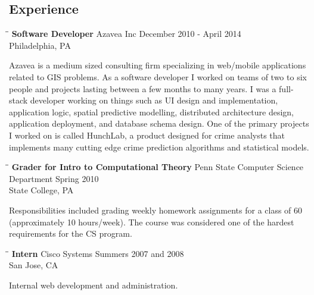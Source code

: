 \documentclass{res}
\begin{document}
\begin{resume}
\section{Experience}
   \vspace{-0.1in}	
   \begin{tabbing}
   \hspace{2.3in}\= \hspace{2.6in}\= \kill %
    {\bf Software Developer} \>Azavea Inc     \>December 2010 - April 2014\\
                             \>Philadelphia, PA
   \end{tabbing}\vspace{-20pt}      %
   Azavea is a medium sized consulting firm specializing in web/mobile
   applications related to GIS problems.  As a software developer I worked
   on teams of two to six people and projects lasting between a
   few months to many years.  I was a full-stack developer working on
   things such as UI design and implementation, application logic, spatial
   predictive modelling, distributed architecture design, application
   deployment, and database schema design.  One of the primary projects I
   worked on is called HunchLab, a product designed for crime analysts that
   implements many cutting edge crime prediction algorithms and statistical
   models.
   \begin{tabbing}
   \hspace{2.3in}\= \hspace{2.6in}\= \kill %
    {\bf Grader for Intro to Computational Theory} \> Penn State Computer Science Department\> Spring 2010\\
                          \>State College, PA
   \end{tabbing}\vspace{-20pt}
    Responsibilities included grading weekly homework assignments for a
    class of 60 (approximately 10 hours/week).
    The course was considered one of the hardest requirements for the CS program.
   \begin{tabbing}%
   \hspace{2.3in}\= \hspace{2.6in}\= \kill %
   {\bf Intern}  \> Cisco Systems\> Summers 2007 and 2008\\
                          \>San Jose, CA
   \end{tabbing}\vspace{-20pt}
   Internal web development and administration.



\end{resume}
\end{document}
